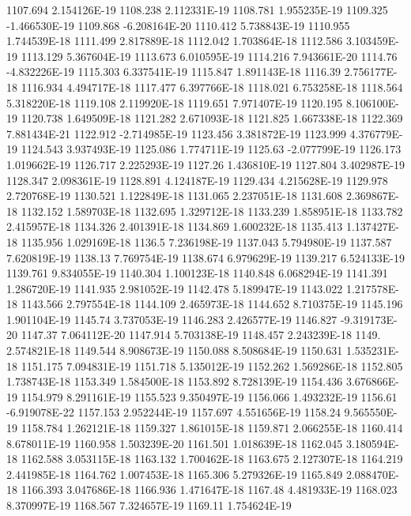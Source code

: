 1107.694  2.154126E-19
1108.238  2.112331E-19
1108.781  1.955235E-19
1109.325  -1.466530E-19
1109.868  -6.208164E-20
1110.412  5.738843E-19
1110.955  1.744539E-18
1111.499  2.817889E-18
1112.042  1.703864E-18
1112.586  3.103459E-19
1113.129  5.367604E-19
1113.673  6.010595E-19
1114.216  7.943661E-20
1114.76  -4.832226E-19
1115.303  6.337541E-19
1115.847  1.891143E-18
1116.39  2.756177E-18
1116.934  4.494717E-18
1117.477  6.397766E-18
1118.021  6.753258E-18
1118.564  5.318220E-18
1119.108  2.119920E-18
1119.651  7.971407E-19
1120.195  8.106100E-19
1120.738  1.649509E-18
1121.282  2.671093E-18
1121.825  1.667338E-18
1122.369  7.881434E-21
1122.912  -2.714985E-19
1123.456  3.381872E-19
1123.999  4.376779E-19
1124.543  3.937493E-19
1125.086  1.774711E-19
1125.63  -2.077799E-19
1126.173  1.019662E-19
1126.717  2.225293E-19
1127.26  1.436810E-19
1127.804  3.402987E-19
1128.347  2.098361E-19
1128.891  4.124187E-19
1129.434  4.215628E-19
1129.978  2.720768E-19
1130.521  1.122849E-18
1131.065  2.237051E-18
1131.608  2.369867E-18
1132.152  1.589703E-18
1132.695  1.329712E-18
1133.239  1.858951E-18
1133.782  2.415957E-18
1134.326  2.401391E-18
1134.869  1.600232E-18
1135.413  1.137427E-18
1135.956  1.029169E-18
1136.5  7.236198E-19
1137.043  5.794980E-19
1137.587  7.620819E-19
1138.13  7.769754E-19
1138.674  6.979629E-19
1139.217  6.524133E-19
1139.761  9.834055E-19
1140.304  1.100123E-18
1140.848  6.068294E-19
1141.391  1.286720E-19
1141.935  2.981052E-19
1142.478  5.189947E-19
1143.022  1.217578E-18
1143.566  2.797554E-18
1144.109  2.465973E-18
1144.652  8.710375E-19
1145.196  1.901104E-19
1145.74  3.737053E-19
1146.283  2.426577E-19
1146.827  -9.319173E-20
1147.37  7.064112E-20
1147.914  5.703138E-19
1148.457  2.243239E-18
1149.  2.574821E-18
1149.544  8.908673E-19
1150.088  8.508684E-19
1150.631  1.535231E-18
1151.175  7.094831E-19
1151.718  5.135012E-19
1152.262  1.569286E-18
1152.805  1.738743E-18
1153.349  1.584500E-18
1153.892  8.728139E-19
1154.436  3.676866E-19
1154.979  8.291161E-19
1155.523  9.350497E-19
1156.066  1.493232E-19
1156.61  -6.919078E-22
1157.153  2.952244E-19
1157.697  4.551656E-19
1158.24  9.565550E-19
1158.784  1.262121E-18
1159.327  1.861015E-18
1159.871  2.066255E-18
1160.414  8.678011E-19
1160.958  1.503239E-20
1161.501  1.018639E-18
1162.045  3.180594E-18
1162.588  3.053115E-18
1163.132  1.700462E-18
1163.675  2.127307E-18
1164.219  2.441985E-18
1164.762  1.007453E-18
1165.306  5.279326E-19
1165.849  2.088470E-18
1166.393  3.047686E-18
1166.936  1.471647E-18
1167.48  4.481933E-19
1168.023  8.370997E-19
1168.567  7.324657E-19
1169.11  1.754624E-19
